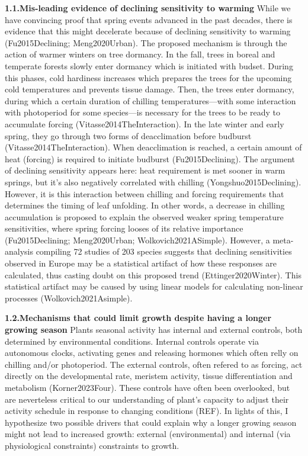 \documentclass{article}
\begin{document}
\textbf{1.1.Mis-leading evidence of declining sensitivity to warming}
While we have convincing proof that spring events advanced in the past decades, there is evidence that this might decelerate because of declining sensitivity to warming (Fu2015Declining; Meng2020Urban). The proposed mechanism is through the action of warmer winters on tree dormancy. In the fall, trees in boreal and temperate forests slowly enter dormancy which is initiated with budset. During this phases, cold hardiness increases which prepares the trees for the upcoming cold temperatures and prevents tissue damage. Then, the trees enter dormancy, during which a certain duration of chilling temperatures---with some interaction with photoperiod for some species---is necessary for the trees to be ready to accumulate forcing (Vitasse2014TheInteraction). In the late winter and early spring, they go through two forms of deacclimation before budburst (Vitasse2014TheInteraction). When deacclimation is reached, a certain amount of heat (forcing) is required to initiate budburst (Fu2015Declining). The argument of declining sensitivity appears here: heat requirement is met sooner in warm springs, but it's also negatively correlated with chilling (Yongshuo2015Declining). However, it is this interaction between chilling and forcing requirements that determines the timing of leaf unfolding. In other words, a decrease in chilling accumulation is proposed to explain the observed weaker spring temperature sensitivities, where spring forcing looses of its relative importance (Fu2015Declining; Meng2020Urban; Wolkovich2021ASimple). However, a meta-analysis compiling 72 studies of 203 species suggests that declining sensitivities observed in Europe may be a statistical artifact of how these responses are calculated, thus casting doubt on this proposed trend (Ettinger2020Winter). This statistical artifact may be caused by using linear models for calculating non-linear processes (Wolkovich2021Asimple).

\textbf{1.2.Mechanisms that could limit growth despite having a longer growing season}
Plants seasonal activity has internal and external controls, both determined by environmental conditions. Internal controls operate via autonomous clocks, activating genes and releasing hormones which often relly on chilling and/or photoperiod. The external controls, often refered to as forcing, act directly on the developmental rate, meristem activity, tissue differentiation and metabolism (Korner2023Four). These controls have often been overlooked, but are neverteless critical to our understanding of plant's capacity to adjust their activity schedule in response to changing conditions (REF). In lights of this, I hypothesize two possible drivers that could explain why a longer growing season might not lead to increased growth: external (environmental) \cite{kolar_response_2016} and internal (via physiological constraints)\cite{zohner_effect_2023} constraints to growth. 
\end{document}
